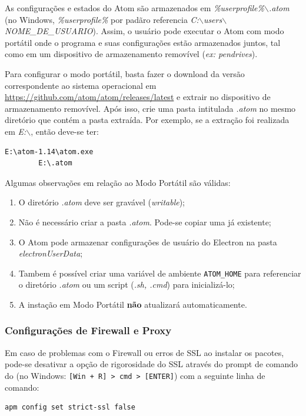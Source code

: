 	As configurações e estados do Atom são armazenados em \textit{\%userprofile\%$\backslash$.atom} (no Windows, \textit{\%userprofile\%} por padãro referencia \textit{C:$\backslash$users$\backslash$NOME\_DE\_USUARIO}). Assim, o usuário pode executar o Atom com modo portátil onde o programa e suas configurações estão armazenados juntos, tal como em um dispositivo de armazenamento removível (\textit{ex: pendrives}).

	Para configurar o modo portátil, basta fazer o download da versão correspondente ao sistema operacional em \href{https://github.com/atom/atom/releases/latest}{https://github.com/atom/atom/releases/latest} e extrair no dispositivo de armazenamento removível. Após isso, crie uma pasta intitulada \textit{.atom} no mesmo diretório que contém a pasta extraída. Por exemplo, se a extração foi realizada em \textit{E:$\backslash$}, então deve-se ter:
	\begin{Verbatim}[fontsize=\footnotesize]
		E:\atom-1.14\atom.exe
		E:\.atom
	\end{Verbatim}
	Algumas observações em relação ao Modo Portátil são válidas:
	\begin{enumerate}
		\item O diretório \textit{.atom} deve ser gravável (\textit{writable});
		\item Não é necessário criar a pasta \textit{.atom}. Pode-se copiar uma já existente;
		\item O Atom pode armazenar configurações de usuário do Electron na pasta \textit{electronUserData};
		\item Tambem é possível criar uma variável de ambiente \verb|ATOM_HOME| para referenciar o diretório \textit{.atom} ou um script (\textit{.sh, .cmd}) para inicializá-lo;
		\item A instação em Modo Portátil \textbf{não} atualizará automaticamente.
	\end{enumerate}

	\subsubsection{Configurações de Firewall e Proxy}\label{sec:fireproxy}
	Em caso de problemas com o Firewall ou erros de SSL ao instalar os pacotes, pode-se desativar a opção de rigorosidade do SSL através do prompt de comando do (no Windows: \verb|[Win + R] > cmd > [ENTER]|) com a seguinte linha de comando:
	\begin{Verbatim}[fontsize=\footnotesize]
		apm config set strict-ssl false
	\end{Verbatim}

